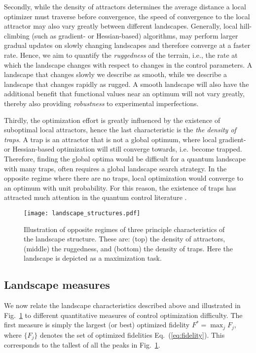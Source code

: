 \documentclass[aps, twocolumn,superscriptaddress]{revtex4-1}
\begin{document}
Secondly, while the density of attractors determines the average distance a local optimizer must traverse before convergence, the speed of convergence to the local attractor may also vary greatly between different landscapes. Generally, local hill-climbing (such as gradient- or Hessian-based) algorithms, may perform larger gradual updates on slowly changing landscapes and therefore converge at a faster rate. Hence, we aim to quantify the \emph{ruggedness} of the terrain, i.e., the rate at which the landscape changes with respect to changes in the control parameters. A landscape that changes slowly we describe as smooth, while we describe a landscape that changes rapidly as rugged. A smooth landscape will also have the additional benefit that functional values near an optimum will not vary greatly, thereby also providing \emph{robustness} to experimental imperfections.

Thirdly, the optimization effort is greatly influenced by the existence of suboptimal local attractors, hence the last characteristic is the \emph{the density of traps}. A trap is an attractor that is not a global optimum, where local gradient- or Hessian-based optimization will still converge towards, i.e.~become trapped. Therefore, finding the global optima would be difficult for a quantum landscape with many traps, often requires a global landscape search strategy. In the opposite regime where there are no traps, local optimization would converge to an optimum with unit probability. For this reason, the existence of traps has attracted much attention in the quantum control literature \cite{rabitz2004quantum,pechen2011there, caneva2011chopped,de2013closer,riviello2015searching,rach2015dressing, jensen2021crowdsourcing}. 


\begin{figure}
    \centering
    \texttt{[image: landscape\_structures.pdf]}
    \caption{Illustration of opposite regimes of three principle characteristics of the landscape structure. These are: (top) the density of attractors, (middle) the ruggedness, and (bottom) the density of traps. Here the landscape is depicted as a maximization task.
}
    \label{fig:landscape structure}
\end{figure}

\subsection{Landscape measures}

We now relate the landscape characteristics described above and illustrated in Fig.~\ref{fig:landscape structure} to different quantitative measures of control optimization difficulty. The first measure is simply the largest (or best) optimized fidelity $F^*=\max_j F_j$, where $\{F_j\}$ denotes the set of optimized fidelities Eq.~(\ref{eq:fidelity}). This corresponds to the tallest of all the peaks in Fig.~\ref{fig:landscape structure}.
\end{document}
